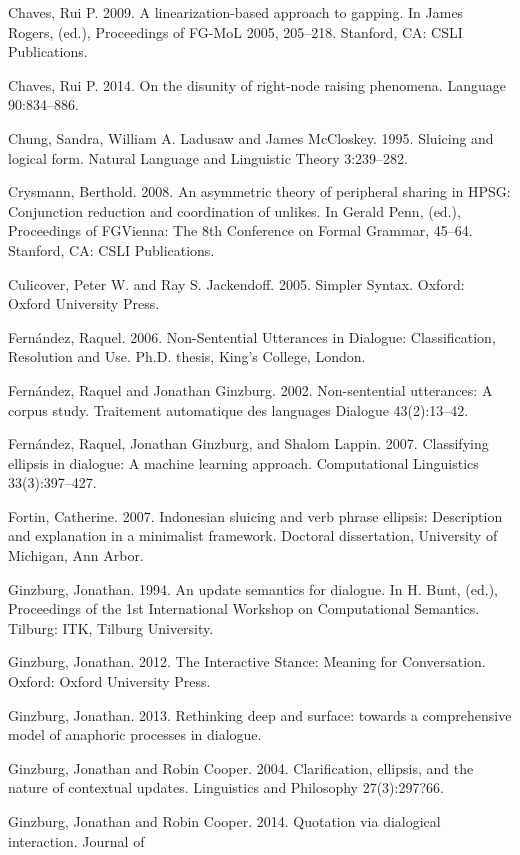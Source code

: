 \documentclass[output=paper
                ,modfonts
                ,nonflat
	        ,collection
	        ,collectionchapter
	        ,collectiontoclongg
 	        ,biblatex
                ,babelshorthands
                ,newtxmath
                ,draftmode
                ,colorlinks, citecolor=brown
]{./langsci/langscibook}
\begin{document}
\begin{description}
\item Chaves, Rui P. 2009. A linearization-based approach to gapping. In James Rogers, (ed.),
Proceedings of FG-MoL 2005, 205--218. Stanford, CA: CSLI Publications.
\item Chaves, Rui P. 2014. On the disunity of right-node raising phenomena. Language 90:834--886.
\item Chung, Sandra, William A. Ladusaw and James McCloskey. 1995. Sluicing and logical form. Natural Language and Linguistic Theory 3:239--282.
\item Crysmann, Berthold. 2008. An asymmetric theory of peripheral sharing in HPSG:
Conjunction reduction and coordination of unlikes. In Gerald Penn, (ed.), Proceedings of
FGVienna: The 8th Conference on Formal Grammar, 45--64. Stanford, CA: CSLI
Publications.
\item Culicover, Peter W. and Ray S. Jackendoff. 2005. Simpler Syntax. Oxford: Oxford University
Press.
\item Fern\'{a}ndez, Raquel. 2006. Non-Sentential Utterances in Dialogue: Classification, Resolution
and Use. Ph.D. thesis, King's College, London.
\item Fern\'{a}ndez, Raquel and Jonathan Ginzburg. 2002. Non-sentential utterances: A corpus study.
Traitement automatique des languages Dialogue 43(2):13--42.
\item Fern\'{a}ndez, Raquel, Jonathan Ginzburg, and Shalom Lappin. 2007. Classifying ellipsis in
dialogue: A machine learning approach. Computational Linguistics 33(3):397--427.
\item Fortin, Catherine. 2007. Indonesian sluicing and verb phrase ellipsis: Description and
explanation in a minimalist framework. Doctoral dissertation, University of Michigan, Ann
Arbor.
\item Ginzburg, Jonathan. 1994. An update semantics for dialogue. In H. Bunt, (ed.), Proceedings of
the 1st International Workshop on Computational Semantics. Tilburg: ITK, Tilburg
University.
\item Ginzburg, Jonathan. 2012. The Interactive Stance: Meaning for Conversation. Oxford:
Oxford University Press.
\item Ginzburg, Jonathan. 2013. Rethinking deep and surface: towards a comprehensive model of anaphoric processes in
dialogue.
\item Ginzburg, Jonathan and Robin Cooper. 2004. Clarification, ellipsis, and the nature of
contextual updates. Linguistics and Philosophy 27(3):297?66.
\item Ginzburg, Jonathan and Robin Cooper. 2014. Quotation via dialogical interaction. Journal of

\end{description}
\end{document}
